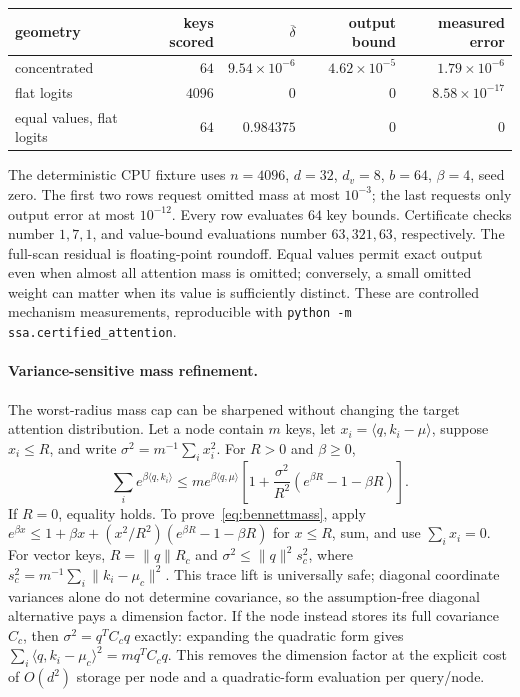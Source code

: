 \documentclass[11pt]{article}
\numberwithin{equation}{section}
\newcommand{\inner}[2]{\langle #1, #2\rangle}
\begin{document}
\begin{center}
\begin{tabular}{lrrrr}
\toprule
geometry & keys scored & $\overline\delta$ & output bound & measured error\\
\midrule
concentrated & $64$ & $9.54\times10^{-6}$ & $4.62\times10^{-5}$ & $1.79\times10^{-6}$\\
flat logits & $4096$ & $0$ & $0$ & $8.58\times10^{-17}$\\
equal values, flat logits & $64$ & $0.984375$ & $0$ & $0$\\
\bottomrule
\end{tabular}
\end{center}
The deterministic CPU fixture uses $n=4096$, $d=32$, $d_v=8$, $b=64$, $\beta=4$, seed zero.
The first two rows request omitted mass at most $10^{-3}$; the last requests only output error
at most $10^{-12}$. Every row evaluates $64$ key bounds. Certificate checks number $1,7,1$,
and value-bound evaluations number $63,321,63$, respectively. The full-scan residual is floating-point
roundoff. Equal values permit exact output even when almost all attention mass is omitted;
conversely, a small omitted weight can matter when its value is sufficiently distinct.
These are controlled mechanism measurements, reproducible with
\texttt{python -m ssa.certified\_attention}.

\paragraph{Variance-sensitive mass refinement.}
The worst-radius mass cap can be sharpened without changing the target attention distribution. Let a node
contain $m$ keys, let $x_i=\inner{q}{k_i-\mu}$, suppose $x_i\le R$, and write
$\sigma^2=m^{-1}\sum_i x_i^2$. For $R>0$ and $\beta\ge0$,
\begin{equation}\label{eq:bennettmass}
\sum_i e^{\beta\inner{q}{k_i}}
\le m e^{\beta\inner{q}{\mu}}
\left[1+\frac{\sigma^2}{R^2}
  \left(e^{\beta R}-1-\beta R\right)\right].
\end{equation}
If $R=0$, equality holds. To prove~\eqref{eq:bennettmass}, apply
$e^{\beta x}\le1+\beta x+(x^2/R^2)(e^{\beta R}-1-\beta R)$ for $x\le R$, sum, and use
$\sum_i x_i=0$. For vector keys, $R=\lVert q\rVert R_c$ and
$\sigma^2\le\lVert q\rVert^2s_c^2$, where
$s_c^2=m^{-1}\sum_i\lVert k_i-\mu_c\rVert^2$. This trace lift is universally safe; diagonal coordinate
variances alone do not determine covariance, so the assumption-free diagonal alternative pays a dimension
factor. If the node instead stores its full covariance $C_c$, then
$\sigma^2=q^TC_cq$ exactly: expanding the quadratic form gives
$\sum_i\inner{q}{k_i-\mu_c}^2=mq^TC_cq$. This removes the dimension factor at the explicit cost of
$O(d^2)$ storage per node and a quadratic-form evaluation per query/node.
\end{document}
